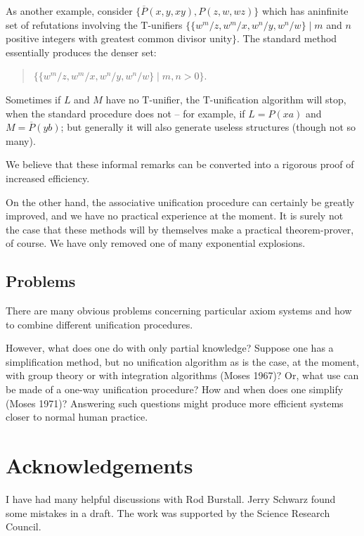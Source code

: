 \documentclass[letterpaper]{report}
\begin{document}
As another example, consider
$\{\overline{P}\left(x,y,xy\right),P\left(z,w,wz\right)\}$ which has
aninfinite set of refutations involving the $\mathrm{T}$-unifiers
$\{\{w^{m}/z,w^{m}/x,w^{n}/y,w^{n}/w\} \mid m$ and $n$ positive
integers with greatest common divisor unity$\}$. The standard method
essentially produces the denser set:
\begin{quote}
$\{\{w^{m}/z, w^{m}/x, w^{n}/y, w^{n}/w\}\mid m, n>0\}$.
\end{quote}

Sometimes if $L$ and $M$ have no $\mathrm{T}$-unifier, the
$\mathrm{T}$-unification algorithm will stop, when the standard
procedure does not -- for example, if $L=P(xa)$ and
$M=\overline{P}(yb)$; but generally it will also generate useless
structures (though not so many).

We believe that these informal remarks can be converted into a rigorous
proof of increased efficiency.

On the other hand, the associative unification procedure can certainly
be greatly improved, and we have no practical experience at the moment.
It is surely not the case that these methods will by themselves make a
practical theorem-prover, of course. We have only removed one of many
exponential explosions.

\subsection*{Problems}\label{problems}

There are many obvious problems concerning particular axiom systems and
how to combine different unification procedures.

However, what does one do with only partial knowledge? Suppose one has a
simplification method, but no unification algorithm as is the case, at
the moment, with group theory or with integration algorithms (Moses
1967)? Or, what use can be made of a one-way unification procedure? How
and when does one simplify (Moses 1971)? Answering such questions might
produce more efficient systems closer to normal human practice.

\section*{Acknowledgements}\label{acknowledgements}

I have had many helpful discussions with Rod Burstall. Jerry Schwarz
found some mistakes in a draft. The work was supported by the Science
Research Council.
\end{document}
